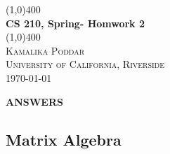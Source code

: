 \documentclass[12pt, oneside]{article}   	%
\begin{document}
	
\begin{titlepage}
	\begin{center}
	\line(1,0){400} \\
    [0.25in]
    \Huge{\bfseries CS 210, Spring- Homwork 2} \\
    [2mm]
    \line(1,0){400} \\
    [3 cm]
    
    \textsc{\LARGE Kamalika Poddar} \\
 
  
    \textsc{\LARGE University of California, Riverside} \\
    [0.7cm]
  \vspace*{7 cm}
  \today
    \end{center} 

\end{titlepage}

\newpage
\vspace{2cm}

\begin{center}
\textbf{ \Large ANSWERS}\\
\end{center}

\vspace{0.5cm}
\subsection*{Matrix Algebra}
\end{document}

